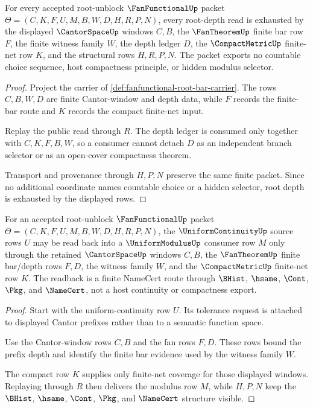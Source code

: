 \begin{theorem}
\label{thm:fanfunctional-root-depth-exhaustion}
For every accepted root-unblock $\FanFunctionalUp$ packet $\Theta=(C,K,F,U,M,B,W,D,H,R,P,N)$, every root-depth read is exhausted by the displayed $\CantorSpaceUp$ windows $C,B$, the $\FanTheoremUp$ finite bar row $F$, the finite witness family $W$, the depth ledger $D$, the $\CompactMetricUp$ finite-net row $K$, and the structural rows $H,R,P,N$. The packet exports no countable choice sequence, host compactness principle, or hidden modulus selector.
\end{theorem}
\begin{proof}
Project the carrier of \autoref{def:fanfunctional-root-bar-carrier}. The rows $C,B,W,D$ are finite Cantor-window and depth data, while $F$ records the finite-bar route and $K$ records the compact finite-net input.

Replay the public read through $R$. The depth ledger is consumed only together with $C,K,F,B,W$, so a consumer cannot detach $D$ as an independent branch selector or as an open-cover compactness theorem.

Transport and provenance through $H,P,N$ preserve the same finite packet. Since no additional coordinate names countable choice or a hidden selector, root depth is exhausted by the displayed rows.
\end{proof}

\begin{theorem}
\label{thm:fanfunctional-cantor-window-modulus-readback}
For an accepted root-unblock $\FanFunctionalUp$ packet $\Theta=(C,K,F,U,M,B,W,D,H,R,P,N)$, the $\UniformContinuityUp$ source rows $U$ may be read back into a $\UniformModulusUp$ consumer row $M$ only through the retained $\CantorSpaceUp$ windows $C,B$, the $\FanTheoremUp$ finite bar/depth rows $F,D$, the witness family $W$, and the $\CompactMetricUp$ finite-net row $K$. The readback is a finite NameCert route through $\BHist$, $\hsame$, $\Cont$, $\Pkg$, and $\NameCert$, not a host continuity or compactness export.
\end{theorem}
\begin{proof}
Start with the uniform-continuity row $U$. Its tolerance request is attached to displayed Cantor prefixes rather than to a semantic function space.

Use the Cantor-window rows $C,B$ and the fan rows $F,D$. These rows bound the prefix depth and identify the finite bar evidence used by the witness family $W$.

The compact row $K$ supplies only finite-net coverage for those displayed windows. Replaying through $R$ then delivers the modulus row $M$, while $H,P,N$ keep the $\BHist$, $\hsame$, $\Cont$, $\Pkg$, and $\NameCert$ structure visible.
\end{proof}


